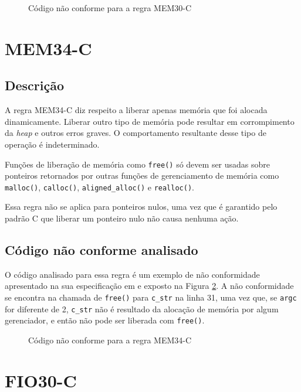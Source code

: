 \begin{figure}[h!]
  \centering
  
  \caption{Código não conforme para a regra MEM30-C}
\label{fig:MEM30-C}
\end{figure}

\section{MEM34-C}
\subsection{Descrição}

A regra MEM34-C diz respeito a liberar apenas memória que foi alocada dinamicamente. Liberar outro tipo de memória pode resultar em corrompimento da \textit{heap} e outros erros graves. O comportamento resultante desse tipo de operação é indeterminado.

Funções de liberação de memória como \texttt{free()} só devem ser usadas sobre ponteiros retornados por outras funções de gerenciamento de memória como \texttt{malloc()}, \texttt{calloc()}, \texttt{aligned\_alloc()} e \texttt{realloc()}.

Essa regra não se aplica para ponteiros nulos, uma vez que é garantido pelo padrão C que liberar um ponteiro nulo não causa nenhuma ação.

\subsection{Código não conforme analisado}

O código analisado para essa regra é um exemplo de não conformidade apresentado na sua especificação em \cite{ccert} e exposto na Figura \ref{fig:MEM34-C}. A não conformidade se encontra na chamada de \texttt{free()} para \texttt{c\_str} na linha 31, uma vez que, se \texttt{argc} for diferente de 2, \texttt{c\_str} não é resultado da alocação de memória por algum gerenciador, e então não pode ser liberada com \texttt{free()}.

\begin{figure}[h!]
  \centering
  
  \caption{Código não conforme para a regra MEM34-C}
\label{fig:MEM34-C}
\end{figure}

\section{FIO30-C}

